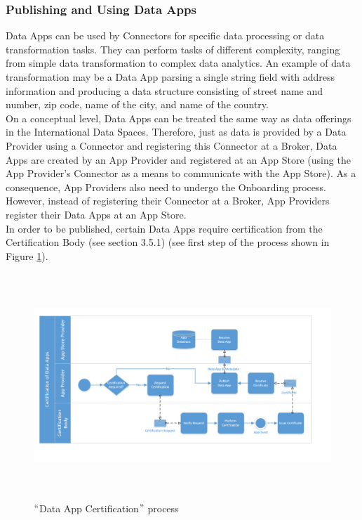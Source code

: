 \subsubsection{Publishing and Using Data Apps}
Data Apps can be used by Connectors for specific data processing or data transformation tasks. They can perform tasks of different complexity, ranging from simple data transformation to complex data analytics. An example of data transformation may be a Data App parsing a single string field with address information and producing a data structure consisting of street name and number, zip code, name of the city, and name of the country.\\
On a conceptual level, Data Apps can be treated the same way as data offerings in the International Data Spaces. Therefore, just as data is provided by a Data Provider using a Connector and registering this Connector at a Broker, Data Apps are created by an App Provider and registered at an App Store (using the App Provider's Connector as a means to communicate with the App Store). As a consequence, App Providers also need to undergo the Onboarding process. However, instead of registering their Connector at a Broker, App Providers register their Data Apps at an App Store.\\
In order to be published, certain Data Apps require certification from the Certification Body (see section 3.5.1) (see first step of the process shown in Figure \ref{fig:_Data_App_Certification__process}).




\begin{figure}[H]
	\begin{Center}
		\includegraphics[width=6.47in,height=3.34in]{./media/image29.png}
		\caption{ $``$Data App Certification$"$  process}
		\label{fig:_Data_App_Certification__process}
	\end{Center}
\end{figure}


